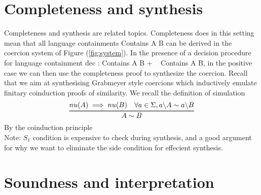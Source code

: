 \documentclass[a4paper,UKenglish,cleveref, autoref, thm-restate]{lipics-v2021}
\begin{document}
\section{Completeness and synthesis}
Completeness and synthesis are related topics. Completeness does in this setting mean that all language containments \textsf{Contains A B} can be derived in the coercion system of Figure (\ref{fig:system}). In the presence of a decision procedure for language containment \textsf{dec : {Contains A B} + {~ Contains A B}}, in the positive case we can then use the completeness proof to synthesize the coercion. Recall that we aim at synthesising Grabmeyer style coercions which inductively emulate finitary coinduction proofs of similarity. We recall the definition of simulation
\[\infer={A \sim B}{\mynu{A} \implies \mynu{B} & \forall a \in \Sigma, \derive{a}{A} \sim \derive{a}{B} }\]
By the coinduction principle\\
Note: $S_1$ condition is expensive to check during synthesis, and a good argument for why we want to eliminate the side condition for effecient synthesis.
\section{Soundness and interpretation}
\end{document}
